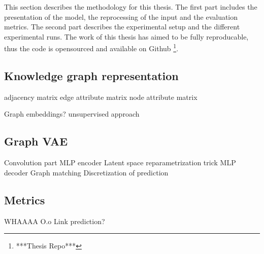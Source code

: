 This section describes the methodology for this thesis. The first part includes the presentation of the model, the reprocessing of the input and the evaluation metrics. The second part describes the experimental setup and the different experimental runs. The work of this thesis has aimed to be fully reproducable, thus the code is opensourced and available on Github \footnote{***Thesis Repo***}.

\subsection{Knowledge graph representation}

adjacency matrix
edge attribute matrix
node attribute matrix

Graph embeddings? unsupervised approach

\subsection{Graph VAE}

Convolution part
MLP encoder
Latent space
reparametrization trick
MLP decoder
Graph matching
Discretization of prediction

\subsection{Metrics}

WHAAAA O.o
Link prediction?